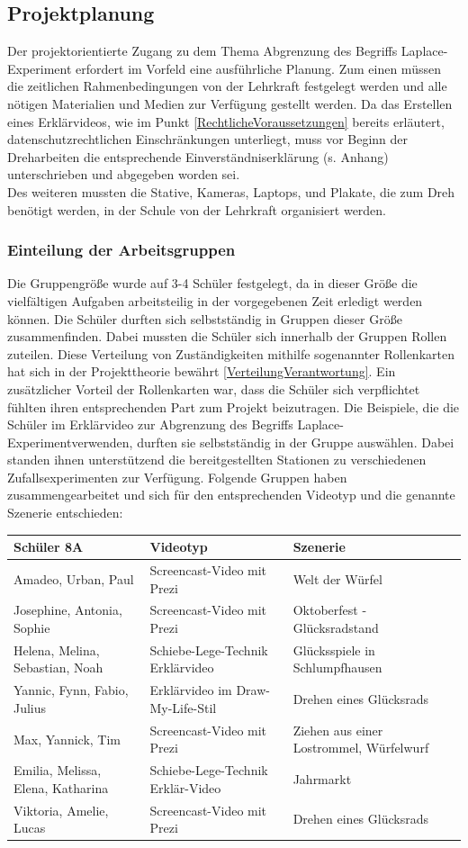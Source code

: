 \documentclass[a4paper,12pt,twoside=false]{scrartcl}
\begin{document}
 \subsection{Projektplanung}
 Der projektorientierte Zugang zu dem Thema Abgrenzung des Begriffs Laplace-Experiment erfordert im Vorfeld eine ausführliche Planung. Zum einen müssen die zeitlichen Rahmenbedingungen von der Lehrkraft festgelegt werden und alle nötigen Materialien und Medien zur Verfügung gestellt werden. Da das Erstellen eines Erklärvideos, wie im Punkt \ref{RechtlicheVoraussetzungen} bereits erläutert, datenschutzrechtlichen Einschränkungen unterliegt, muss vor Beginn der Dreharbeiten die entsprechende Einverständniserklärung (s. Anhang) unterschrieben und abgegeben worden sei. \\
 Des weiteren mussten die Stative, Kameras, Laptops, und Plakate, die zum Dreh benötigt werden, in der Schule von der Lehrkraft organisiert werden. 
 \subsubsection{Einteilung der Arbeitsgruppen}
 Die Gruppengröße wurde auf 3-4 Schüler festgelegt, da in dieser Größe die vielfältigen Aufgaben arbeitsteilig in der vorgegebenen Zeit erledigt werden können.  Die Schüler durften sich selbstständig in Gruppen dieser Größe zusammenfinden. Dabei mussten die Schüler sich innerhalb der Gruppen Rollen zuteilen. Diese Verteilung von Zuständigkeiten mithilfe sogenannter Rollenkarten hat sich in der Projekttheorie bewährt \ref{VerteilungVerantwortung}. Ein zusätzlicher Vorteil der Rollenkarten war, dass die Schüler sich verpflichtet fühlten ihren entsprechenden Part zum Projekt beizutragen. Die Beispiele, die die Schüler im Erklärvideo zur Abgrenzung des Begriffs \glqq Laplace-Experiment\grqq verwenden, durften sie selbstständig in der Gruppe auswählen. Dabei standen ihnen unterstützend die bereitgestellten Stationen zu verschiedenen Zufallsexperimenten zur Verfügung. 
 Folgende Gruppen haben zusammengearbeitet und sich für den entsprechenden Videotyp und die genannte Szenerie entschieden:
 \begin{longtable}{|p{}|l|p{}|}\hline
 	\textbf{\large{Schüler 8A}}& \textbf{\large{Videotyp}} & \textbf{\large{Szenerie}}\\\hline
 	Amadeo, Urban, Paul & Screencast-Video mit Prezi & Welt der Würfel\\\hline
 	Josephine, Antonia, Sophie & Screencast-Video mit Prezi & Oktoberfest - Glücksradstand\\\hline
 	Helena, Melina, Sebastian, Noah & Schiebe-Lege-Technik Erklärvideo & Glücksspiele in Schlumpfhausen\\\hline
 	Yannic, Fynn, Fabio, Julius & Erklärvideo im Draw-My-Life-Stil & Drehen eines Glücksrads \\\hline
 	Max, Yannick, Tim & Screencast-Video mit Prezi & Ziehen aus einer Lostrommel, Würfelwurf\\\hline
 	Emilia, Melissa, Elena, Katharina & Schiebe-Lege-Technik Erklär-Video & Jahrmarkt\\\hline 
 	Viktoria, Amelie, Lucas & Screencast-Video mit Prezi & Drehen eines Glücksrads\\\hline
 \end{longtable}
\end{document}
